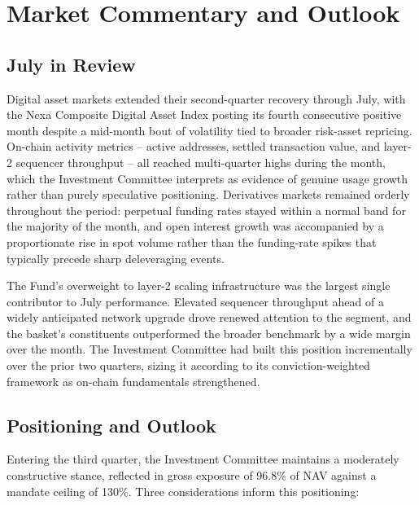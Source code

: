\section{Market Commentary and Outlook}

\subsection{July in Review}

Digital asset markets extended their second-quarter recovery through July, with the Nexa Composite Digital Asset Index posting its fourth consecutive positive month despite a mid-month bout of volatility tied to broader risk-asset repricing. On-chain activity metrics -- active addresses, settled transaction value, and layer-2 sequencer throughput -- all reached multi-quarter highs during the month, which the Investment Committee interprets as evidence of genuine usage growth rather than purely speculative positioning. Derivatives markets remained orderly throughout the period: perpetual funding rates stayed within a normal band for the majority of the month, and open interest growth was accompanied by a proportionate rise in spot volume rather than the funding-rate spikes that typically precede sharp deleveraging events.

The Fund's overweight to layer-2 scaling infrastructure was the largest single contributor to July performance. Elevated sequencer throughput ahead of a widely anticipated network upgrade drove renewed attention to the segment, and the basket's constituents outperformed the broader benchmark by a wide margin over the month. The Investment Committee had built this position incrementally over the prior two quarters, sizing it according to its conviction-weighted framework as on-chain fundamentals strengthened.

\subsection{Positioning and Outlook}

Entering the third quarter, the Investment Committee maintains a moderately constructive stance, reflected in gross exposure of 96.8\% of NAV against a mandate ceiling of 130\%. Three considerations inform this positioning:


